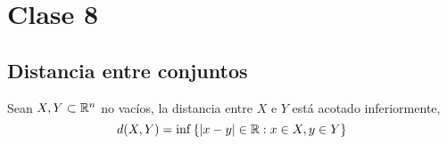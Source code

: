 \chapter{Clase 8}

\section{Distancia entre conjuntos}
Sean $X, Y \subset  \mathbb{R}^{n} $ no vacíos, la distancia entre $X \text{ e } Y$ está acotado inferiormente,
\begin{equation}
	d(X,Y)= \inf \qty{\abs{x-y } \in \mathbb{R}: x \in X, y \in Y}
\end{equation}

